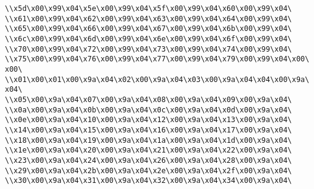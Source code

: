 \verb|\\x5d\x00\x99\x04\x5e\x00\x99\x04\x5f\x00\x99\x04\x60\x00\x99\x04\|\newline
\verb|\\x61\x00\x99\x04\x62\x00\x99\x04\x63\x00\x99\x04\x64\x00\x99\x04\|\newline
\verb|\\x65\x00\x99\x04\x66\x00\x99\x04\x67\x00\x99\x04\x6b\x00\x99\x04\|\newline
\verb|\\x6c\x00\x99\x04\x6d\x00\x99\x04\x6e\x00\x99\x04\x6f\x00\x99\x04\|\newline
\verb|\\x70\x00\x99\x04\x72\x00\x99\x04\x73\x00\x99\x04\x74\x00\x99\x04\|\newline
\verb|\\x75\x00\x99\x04\x76\x00\x99\x04\x77\x00\x99\x04\x79\x00\x99\x04\x00\x00\|\newline
\verb|\\x01\x00\x01\x00\x9a\x04\x02\x00\x9a\x04\x03\x00\x9a\x04\x04\x00\x9a\x04\|\newline
\verb|\\x05\x00\x9a\x04\x07\x00\x9a\x04\x08\x00\x9a\x04\x09\x00\x9a\x04\|\newline
\verb|\\x0a\x00\x9a\x04\x0b\x00\x9a\x04\x0c\x00\x9a\x04\x0d\x00\x9a\x04\|\newline
\verb|\\x0e\x00\x9a\x04\x10\x00\x9a\x04\x12\x00\x9a\x04\x13\x00\x9a\x04\|\newline
\verb|\\x14\x00\x9a\x04\x15\x00\x9a\x04\x16\x00\x9a\x04\x17\x00\x9a\x04\|\newline
\verb|\\x18\x00\x9a\x04\x19\x00\x9a\x04\x1a\x00\x9a\x04\x1d\x00\x9a\x04\|\newline
\verb|\\x1e\x00\x9a\x04\x20\x00\x9a\x04\x21\x00\x9a\x04\x22\x00\x9a\x04\|\newline
\verb|\\x23\x00\x9a\x04\x24\x00\x9a\x04\x26\x00\x9a\x04\x28\x00\x9a\x04\|\newline
\verb|\\x29\x00\x9a\x04\x2b\x00\x9a\x04\x2e\x00\x9a\x04\x2f\x00\x9a\x04\|\newline
\verb|\\x30\x00\x9a\x04\x31\x00\x9a\x04\x32\x00\x9a\x04\x34\x00\x9a\x04\|\newline
